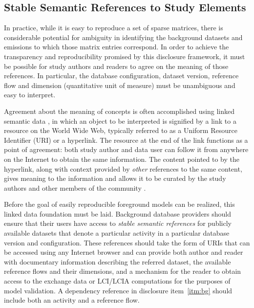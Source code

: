 \subsection{Stable Semantic References to Study Elements}

In practice, while it is easy to reproduce a set of sparse matrices, there is considerable potential for ambiguity
in identifying the background datasets and emissions to which those matrix entries correspond.
In order to achieve the transparency and reproducibility promised by this disclosure framework, it must be possible for study authors and readers to agree on the meaning of those references.  In particular, the database configuration, dataset version, reference flow and dimension (quantitative unit of measure) must be unambiguous and easy to interpret.

Agreement about the meaning of concepts is often accomplished using linked semantic data \citep{Bizer_2009}, in which an object to be interpreted is signified by a link to a resource on the World Wide Web, typically referred to as a Uniform Resource Identifier (URI) or a hyperlink.  The resource at the end of the link functions as a point of agreement: both study author and data user can follow it from anywhere on the Internet to obtain the same information.  The content pointed to by the hyperlink, along with context provided by \emph{other} references to the same content, gives meaning to the information and allows it to be curated by the study authors and other members of the community \citep{Khan_2011}.   %

Before the goal of easily reproducible foreground models can be realized, this linked data foundation must be laid.  Background database providers should ensure that their users have access to \emph{stable semantic references} for publicly available datasets that denote a particular activity in a particular database version and configuration.  These references should take the form of URIs that can be accessed using any Internet browser and can provide both author and reader with documentary information describing the referred dataset, the available reference flows and their dimensions, and a mechanism for the reader to obtain access to the exchange data or LCI/LCIA computations for the purposes of model validation.  A dependency reference in disclosure item~\ref{itm:bg} should include both an activity and a reference flow.

